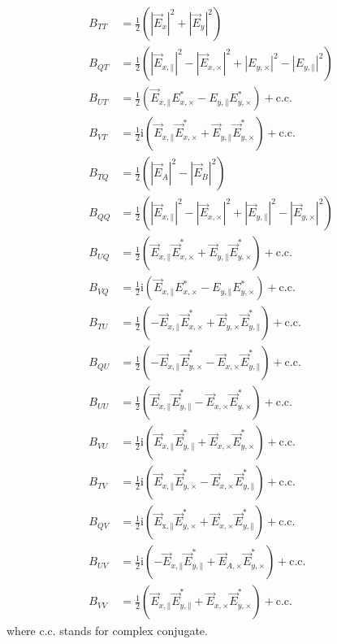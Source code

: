 \documentclass[a4paper,11pt]{article}
\newcommand{\co}{\mathbin{\|}}
\newcommand{\cx}{\mathbin{\times}}
\begin{document}
\begin{equation}
\begin{split}
B_{TT}&=\frac{1}{2}\left(\left|\vec{E}_{x}\right|^{2}+\left|\vec{E}_{y}\right|^{2}\right)\\
B_{QT}&=\frac{1}{2}\left(\left|\vec{E}_{x,\co}\right|^{2}-\left|\vec{E}_{x,\cx}\right|^{2} +  \left|E_{y,\cx}\right|^{2}-\left|E_{y,\co}\right|^{2}\right)\\
B_{UT}&=\frac{1}{2}\left(\vec{E}_{x,\co} E_{x,\cx}^{*} - E_{y,\co} E_{y,\cx}^{*}\right) + \mathrm{c.c.}\\
B_{VT}&=\frac{1}{2}\mathrm{i}\left(\vec{E}_{x,\co}\vec{E}_{x,\cx}^{*} + \vec{E}_{y,\co} \vec{E}_{y,\cx}^{*}\right) + \mathrm{c.c.}\\
B_{TQ}&=\frac{1}{2}\left(\left|\vec{E}_{A}\right|^{2}-\left|\vec{E}_{B}\right|^{2}\right)\\
B_{QQ}&=\frac{1}{2}\left(\left|\vec{E}_{x,\co}\right|^{2}-\left|\vec{E}_{x,\cx}\right|^{2}+\left|\vec{E}_{y,\co}\right|^{2}-\left|\vec{E}_{y,\cx}\right|^{2}\right)\\
B_{UQ}&=\frac{1}{2}\left(\vec{E}_{x,\co} \vec{E}_{x,\cx}^{*} + \vec{E}_{y,\co} \vec{E}_{y,\cx}^{*}\right)+\mathrm{c.c.}\\
B_{VQ}&=\frac{1}{2}\mathrm{i}\left( \vec{E}_{x,\co} E_{x,\cx}^{*} - E_{y,\co} E_{y,\cx}^{*}\right)+\mathrm{c.c.}\\
B_{TU}&=\frac{1}{2}\left( -\vec{E}_{x,\co} \vec{E}_{x,\cx}^{*} + \vec{E}_{y,\cx} \vec{E}_{y,\co}^{*}\right)+\mathrm{c.c.}\\
B_{QU}&=\frac{1}{2}\left(-\vec{E}_{x,\co}\vec{E}_{y,\cx}^{*} - \vec{E}_{x,\cx} \vec{E}_{y,\co}^{*}\right)+\mathrm{c.c.}\\
B_{UU}&=\frac{1}{2}\left(\vec{E}_{x,\co} \vec{E}_{y,\co}^{*} - \vec{E}_{x,\cx} \vec{E}_{y,\cx}^{*}\right)+\mathrm{c.c.}\\
B_{VU}&=\frac{1}{2}\mathrm{i}\left(\vec{E}_{x,\co} \vec{E}_{y,\co}^{*} + \vec{E}_{x,\cx}\vec{E}_{y,\cx}^{*}\right)+\mathrm{c.c.}\\
B_{TV}&=\frac{1}{2}\mathrm{i}\left(\vec{E}_{x,\co} \vec{E}_{y,\cx}^{*} - \vec{E}_{x,\cx}\vec{E}_{y,\co}^{*}\right)+\mathrm{c.c.}\\
B_{QV}&=\frac{1}{2}\mathrm{i}\left(\vec{E}_{\mathrm{x,\co}} \vec{E}_{y,\cx}^{*} + \vec{E}_{x,\cx} \vec{E}_{y,\co}^{*}\right)+\mathrm{c.c.}\\
B_{UV}&=\frac{1}{2}\mathrm{i}\left(-\vec{E}_{x,\co} \vec{E}_{y,\co}^{*} + \vec{E}_{A,\cx} \vec{E}_{y,\cx}^{*}\right)+\mathrm{c.c.}\\
B_{VV}&=\frac{1}{2}\left(\vec{E}_{x,\co} \vec{E}_{y,\co}^{*} + \vec{E}_{x,\cx} \vec{E}_{y,\cx}^{*}\right)+\mathrm{c.c.}
\end{split}
\end{equation}
%
\noindent
where c.c. stands for complex conjugate.
\end{document}
